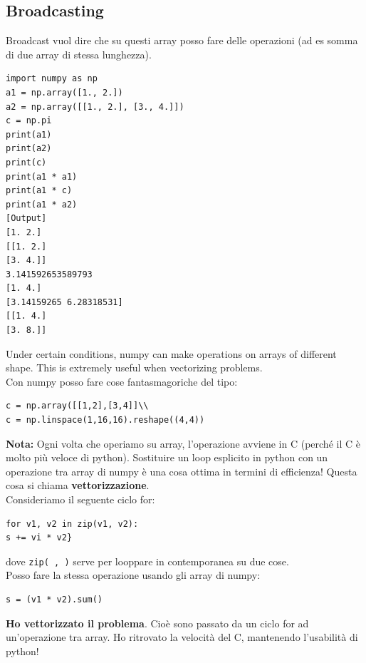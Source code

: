 \subsection{Broadcasting}
Broadcast vuol dire che su questi array posso fare delle operazioni (ad es somma di due array di stessa lunghezza).\\

\begin{verbatim}
import numpy as np
a1 = np.array([1., 2.])
a2 = np.array([[1., 2.], [3., 4.]])
c = np.pi
print(a1)
print(a2)
print(c)
print(a1 * a1)
print(a1 * c)
print(a1 * a2)
[Output]
[1. 2.]
[[1. 2.]
[3. 4.]]
3.141592653589793
[1. 4.]
[3.14159265 6.28318531]
[[1. 4.]
[3. 8.]]
\end{verbatim}
Under certain conditions, numpy can make operations on arrays of different shape. This is extremely useful when vectorizing problems.\\

Con numpy posso fare cose fantasmagoriche del tipo:\\

\begin{verbatim}
c = np.array([[1,2],[3,4]]\\
c = np.linspace(1,16,16).reshape((4,4))
\end{verbatim}

\textbf{Nota:} Ogni volta che operiamo su array, l'operazione avviene in C (perché il C è molto più veloce di python).
Sostituire un loop esplicito in python con un operazione tra array di numpy è una cosa ottima in termini di efficienza! Questa cosa si chiama \textbf{vettorizzazione}.\\
Consideriamo il seguente ciclo for:\\

\begin{verbatim}
for v1, v2 in zip(v1, v2):
s += vi * v2}
\end{verbatim}


\noindent
dove \texttt{zip( , )} serve per looppare in contemporanea su due cose.\\
Posso fare la stessa operazione usando gli array di numpy:\\

\begin{verbatim}
s = (v1 * v2).sum()
\end{verbatim}


\textbf{Ho vettorizzato il problema}. Cioè sono passato da un ciclo for ad un'operazione tra array. Ho ritrovato la velocità del C, mantenendo l'usabilità di python!

